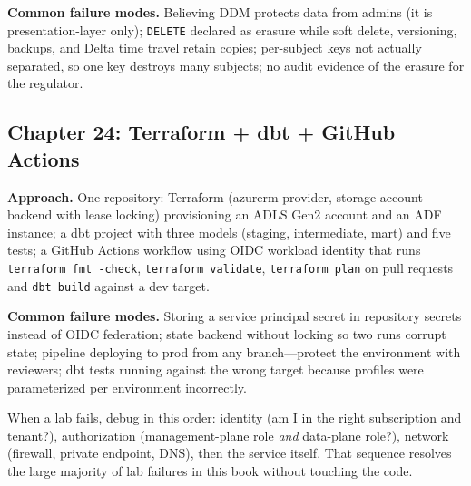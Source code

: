 \textbf{Common failure modes.} Believing DDM protects data from admins (it is presentation-layer
only); \texttt{DELETE} declared as erasure while soft delete, versioning, backups, and Delta time
travel retain copies; per-subject keys not actually separated, so one key destroys many subjects;
no audit evidence of the erasure for the regulator.

\subsection*{Chapter 24: Terraform + dbt + GitHub Actions}
\textbf{Approach.} One repository: Terraform (azurerm provider, storage-account backend with
lease locking) provisioning an ADLS Gen2 account and an ADF instance; a dbt project with three
models (staging, intermediate, mart) and five tests; a GitHub Actions workflow using OIDC
workload identity that runs \texttt{terraform fmt -check}, \texttt{terraform validate},
\texttt{terraform plan} on pull requests and \texttt{dbt build} against a dev target.

\textbf{Common failure modes.} Storing a service principal secret in repository secrets instead
of OIDC federation; state backend without locking so two runs corrupt state; pipeline deploying
to prod from any branch---protect the environment with reviewers; dbt tests running against the
wrong target because profiles were parameterized per environment incorrectly.

\begin{tipbox}
When a lab fails, debug in this order: identity (am I in the right subscription and tenant?),
authorization (management-plane role \emph{and} data-plane role?), network (firewall, private
endpoint, DNS), then the service itself. That sequence resolves the large majority of lab
failures in this book without touching the code.
\end{tipbox}
